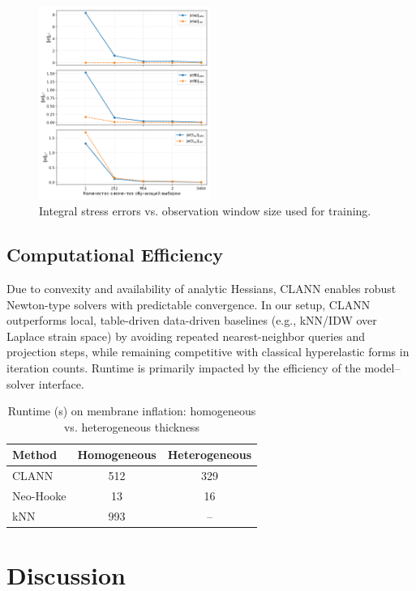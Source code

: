 \documentclass[journal,article,submit,pdftex,moreauthors]{Definitions/mdpi}
\begin{document}
\begin{figure}[H]
  \centering
  \includegraphics[width=0.5\textwidth]{../img/integral_errors.png}
  \caption{Integral stress errors vs. observation window size used for training.}
  \label{fig:integral_errors}
\end{figure}

\subsection{Computational Efficiency}
Due to convexity and availability of analytic Hessians, CLANN enables robust Newton-type solvers with predictable convergence. In our setup, CLANN outperforms local, table-driven data-driven baselines (e.g., kNN/IDW over Laplace strain space) by avoiding repeated nearest-neighbor queries and projection steps, while remaining competitive with classical hyperelastic forms in iteration counts. Runtime is primarily impacted by the efficiency of the model–solver interface.

\begin{table}[H]
\centering
\caption{Runtime (s) on membrane inflation: homogeneous vs. heterogeneous thickness}
\label{tab:experiments_summary_eng}
\begin{tabular}{|l|c|c|}
\hline
\textbf{Method} & \textbf{Homogeneous} & \textbf{Heterogeneous} \\
\hline
CLANN & 512 & 329 \\
\hline
Neo-Hooke & 13 & 16 \\
\hline
kNN & 993 & -- \\
\hline
\end{tabular}
\end{table}

\section{Discussion}
\end{document}
